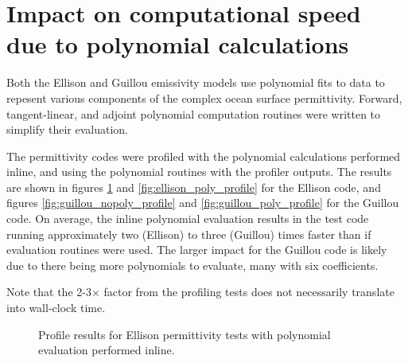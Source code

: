\section{Impact on computational speed due to polynomial calculations}
\label{sec:Poly_Routine_Speed.appendix}
Both the Ellison \cite{Ellison_etal_2003} and Guillou \cite{Guillou_etal_1998} emissivity models use polynomial fits to data to repesent various components of the complex ocean surface permittivity. Forward, tangent-linear, and adjoint polynomial computation routines were written to simplify their evaluation.

The permittivity codes were profiled with the polynomial calculations performed inline, and using the polynomial routines with the profiler outputs. The results are shown in figures \ref{fig:ellison_nopoly_profile} and \ref{fig:ellison_poly_profile} for the Ellison code, and figures \ref{fig:guillou_nopoly_profile} and \ref{fig:guillou_poly_profile} for the Guillou code. On average, the inline polynomial evaluation results in the test code running approximately two (Ellison) to three (Guillou) times faster than if evaluation routines were used. The larger impact for the Guillou code is likely due to there being more polynomials to evaluate, many with six coefficients.

Note that the 2-3$\times$ factor from the profiling tests does not necessarily translate into wall-clock time.

\begin{figure}[htp]
  \centering
  \caption{Profile results for Ellison permittivity tests with polynomial evaluation performed inline.}
  \label{fig:ellison_nopoly_profile}
\end{figure}

